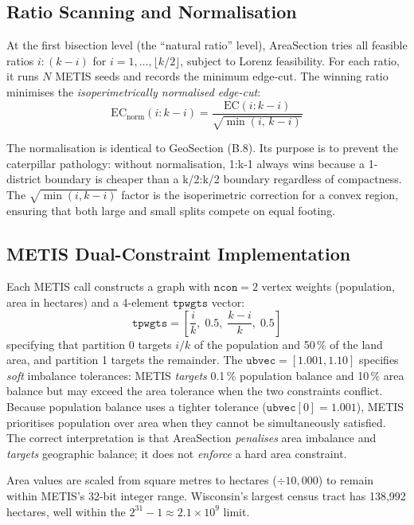 \subsection{Ratio Scanning and Normalisation}

At the first bisection level (the ``natural ratio'' level), AreaSection tries
all feasible ratios $i:(k-i)$ for $i = 1, \ldots, \lfloor k/2 \rfloor$,
subject to Lorenz feasibility.
For each ratio, it runs $N$ METIS seeds and records the minimum edge-cut.
The winning ratio minimises the \emph{isoperimetrically normalised edge-cut}:
\[
  \mathrm{EC}_{\text{norm}}(i:k-i) = \frac{\mathrm{EC}(i:k-i)}{\sqrt{\min(i,\, k-i)}}
\]

The normalisation is identical to GeoSection (B.8).
Its purpose is to prevent the caterpillar pathology: without normalisation,
1:k-1 always wins because a 1-district boundary is cheaper than a k/2:k/2
boundary regardless of compactness.
The $\sqrt{\min(i,k-i)}$ factor is the isoperimetric correction for a convex
region, ensuring that both large and small splits compete on equal footing.

\subsection{METIS Dual-Constraint Implementation}

Each METIS call constructs a graph with $\mathtt{ncon}=2$ vertex weights
(population, area in hectares) and a 4-element $\mathtt{tpwgts}$ vector:
\[
  \mathtt{tpwgts} = \left[\frac{i}{k},\; 0.5,\; \frac{k-i}{k},\; 0.5\right]
\]
specifying that partition 0 targets $i/k$ of the population and 50\,\% of
the land area, and partition 1 targets the remainder.
The $\mathtt{ubvec} = [1.001, 1.10]$ specifies \emph{soft} imbalance tolerances:
METIS \emph{targets} 0.1\,\% population balance and 10\,\% area balance but may
exceed the area tolerance when the two constraints conflict.
Because population balance uses a tighter tolerance ($\mathtt{ubvec}[0] = 1.001$),
METIS prioritises population over area when they cannot be simultaneously
satisfied.
The correct interpretation is that AreaSection \emph{penalises} area imbalance
and \emph{targets} geographic balance; it does not \emph{enforce} a hard area
constraint.

Area values are scaled from square metres to hectares ($\div 10{,}000$) to
remain within METIS's 32-bit integer range.
Wisconsin's largest census tract has 138{,}992 hectares, well within the
$2^{31} - 1 \approx 2.1 \times 10^9$ limit.

